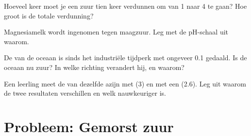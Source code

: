 \begin{exercise}[$\star\star$]\label{exo:g9:acids-bases-ph:9}
Hoeveel keer moet je een zuur tien keer verdunnen om van  1 naar  4
te gaan? Hoe groot is de totale verdunning?
\end{exercise}

\begin{exercise}[$\star\star$]\label{exo:g9:acids-bases-ph:10}
Magnesiamelk wordt ingenomen tegen maagzuur. Leg met de pH-schaal uit
waarom.
\end{exercise}

\begin{exercise}[$\star\star\star$]\label{exo:g9:acids-bases-ph:11}
De  van de oceaan is sinds het industriële tijdperk met ongeveer 0.1
gedaald. Is de oceaan nu zuur? In welke richting verandert hij, en
waarom?
\end{exercise}

\begin{exercise}[$\star\star\star$]\label{exo:g9:acids-bases-ph:12}
Een leerling meet de  van dezelfde azijn met  (3) en met een
 (2.6). Leg uit waarom de twee resultaten verschillen en welk
nauwkeuriger is.
\end{exercise}

\section{Probleem: Gemorst zuur}

